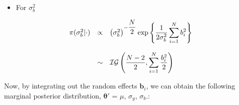 \documentclass{asaproc}
\begin{document}
\begin{itemize}
\item For $\sigma_b^2$
\end{itemize}

\begin{small}
\begin{eqnarray*}
\begin{array}{lcl ll }

\pi(\sigma_b^2|\cdot) & \propto & \left(\sigma_b^2\right)^{-\dfrac{N}{2}}\mbox{exp}\left\{ \dfrac{1}{2\sigma_b^2}\displaystyle\sum_{i=1}^{N} b_i^2\right\}\\ \\

& \sim &  \mathcal{IG} \left( \dfrac{N-2}{2} , \displaystyle\sum_{i=1}^{N}\dfrac{b_i^2}{2} \right)

\end{array}
\end{eqnarray*}
\end{small}

Now, by integrating out the random effects $\boldsymbol{b}_i$, we can obtain the following marginal posterior distribution, $\boldsymbol{\theta}'$ = $\mu$, $\sigma_y$, $\sigma_b$.:
\end{document}
